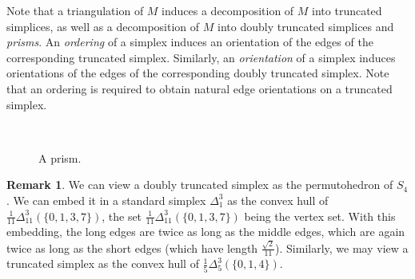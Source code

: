 \documentclass[12pt]{amsart}
\theoremstyle{definition}
\newtheorem{remark}[theorem]{Remark}
\numberwithin{equation}{section}
\begin{document}
Note that a triangulation of $M$ induces a decomposition of $M$ into truncated simplices, as well as a decomposition of $M$ into doubly truncated simplices and \emph{prisms}. 
An \emph{ordering} of a simplex induces an orientation of the edges of the corresponding truncated simplex. Similarly, an \emph{orientation} of a simplex induces orientations of the edges of the corresponding doubly truncated simplex. Note that an ordering is required to obtain natural edge orientations on a truncated simplex.

\begin{figure}[htb]
\begin{center}
\begin{minipage}[b]{0.34\textwidth}
\scalebox{0.9}{
}
\end{minipage}
\hfill
\begin{minipage}[b]{0.34\textwidth}
\scalebox{0.9}{
}
\end{minipage}
\hfill
\begin{minipage}[b]{0.3\textwidth}
\qquad
\scalebox{0.9}{
}
\end{minipage}\\ \vspace{-0.4cm}
\begin{minipage}[t]{0.34\textwidth}
\caption{A truncated simplex. Edge orientations induced by the vertex ordering.}\label{fig:Truncated}
\end{minipage}
\begin{minipage}[t]{0.34\textwidth}
\caption{A doubly truncated simplex. Edge orientations induced by the orientation.}\label{fig:DoublyTruncated} %
\end{minipage}
\begin{minipage}[t]{0.3\textwidth}
\caption{A prism.}\label{fig:Prism}
\end{minipage}
\hfill
\end{center}
\end{figure}






\begin{remark}
We can view a doubly truncated simplex as the permutohedron of $S_4$. We can embed it in a standard simplex $\Delta^3_1$ as the convex hull of $\frac{1}{11}\Delta^3_{11}(\{0,1,3,7\})$, the set $\frac{1}{11}\Delta^3_{11}(\{0,1,3,7\})$ being the vertex set. With this embedding, the long edges are twice as long as the middle edges, which are again twice as long as the short edges (which have length $\frac{\sqrt{2}}{11}$). Similarly, we may view a truncated simplex as the convex hull of $\frac{1}{5}\Delta^3_{5}(\{0,1,4\})$.
\end{remark}
\end{document}
